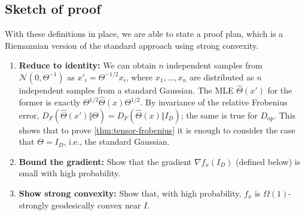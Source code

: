 \documentclass[aos]{imsart}
\theoremstyle{definition}
\numberwithin{equation}{section}
\DeclareMathOperator{\op}{op}
\renewcommand{\P}{{\mathbb{P}}}
\newcommand{\cN}{\mathcal{N}}
\newcommand{\samp}{x}
\begin{document}
\subsection{Sketch of proof}\label{subsec:proof-sketch}







With these definitions in place, we are able to state a proof plan, which is a Riemannian version of the standard approach using strong convexity.

\begin{enumerate}
\item\label{it:reduce}
\textbf{Reduce to identity:}
We can obtain $n$ independent samples from $\cN(0, \Theta^{-1})$ as $x'_i = \Theta^{-1/2} x_i$, where $x_1,\dots,x_n$ are distributed as $n$ independent samples from a standard Gaussian.
The MLE $\widehat{\Theta}(x')$ for the former is exactly $\Theta^{1/2} \widehat{\Theta}(x) \Theta^{1/2}$.
By invariance of the relative Frobenius error, $D_F(\widehat\Theta(x') \Vert \Theta) = D_F(\widehat\Theta(x) \Vert I_D)$; the same is true for $D_{\op}$.
This shows that to prove \cref{thm:tensor-frobenius} it is enough to consider the case that $\Theta = I_D$, i.e., the standard Gaussian.
\item\label{it:grad} \textbf{Bound the gradient:}
Show that the gradient $\nabla f_x(I_D)$ (defined below) is small with high probability.
\item\label{it:convexity} \textbf{Show strong convexity:}
Show that, with high probability, $f_x$ is $\Omega(1)$-strongly geodesically convex near $I$.
\end{enumerate}
\end{document}
